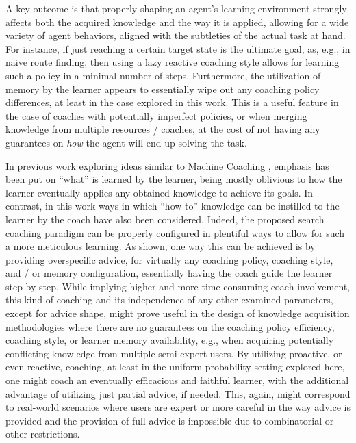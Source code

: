 \documentclass[a4paper,twoside]{article}
\begin{document}
A key outcome is that properly shaping an agent's learning environment strongly affects both the acquired knowledge and the way it is applied, allowing for a wide variety of agent behaviors, aligned with the subtleties of the actual task at hand. For instance, if just reaching a certain target state is the ultimate goal, as, e.g., in naive route finding, then using a lazy reactive coaching style allows for learning such a policy in a minimal number of steps. Furthermore, the utilization of memory by the learner appears to essentially wipe out any coaching policy differences, at least in the case explored in this work. This is a useful feature in the case of coaches with potentially imperfect policies, or when merging knowledge from multiple resources / coaches, at the cost of not having any guarantees on \emph{how} the agent will end up solving the task.

In previous work exploring ideas similar to Machine Coaching \cite{ioannouKnowledgeBasedTranslationNatural2021,proxyCoaching2022}, emphasis has been put on ``what'' is learned by the learner, being mostly oblivious to how the learner eventually applies any obtained knowledge to achieve its goals. In contrast, in this work ways in which ``how-to'' knowledge can be instilled to the learner by the coach have also been considered. Indeed, the proposed search coaching paradigm can be properly configured in plentiful ways to allow for such a more meticulous learning. As shown, one way this can be achieved is by providing overspecific advice, for virtually any coaching policy, coaching style, and / or memory configuration, essentially having the coach guide the learner step-by-step. While implying higher and more time consuming coach involvement, this kind of coaching and its independence of any other examined parameters, except for advice shape, might prove useful in the design of knowledge acquisition methodologies where there are no guarantees on the coaching policy efficiency, coaching style, or learner memory availability, e.g., when acquiring potentially conflicting knowledge from multiple semi-expert users. By utilizing proactive, or even reactive, coaching, at least in the uniform probability setting explored here, one might coach an eventually efficacious and faithful learner, with the additional advantage of utilizing just partial advice, if needed. This, again, might correspond to real-world scenarios where users are expert or more careful in the way advice is provided and the provision of full advice is impossible due to combinatorial or other restrictions.
\end{document}
